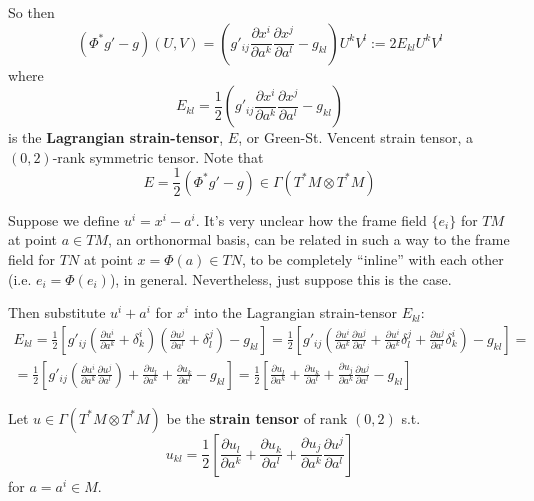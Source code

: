 \documentclass[twoside,landscape,10pt]{amsart}
\theoremstyle{plain}
\theoremstyle{definition}
\theoremstyle{remark}
\begin{document}
\begin{multicols*}{2}
So then 
\[
(\Phi^* g' - g)(U,V) = \left( g'_{ij} \frac{ \partial x^i}{ \partial a^k} \frac{ \partial x^j}{ \partial a^l} - g_{kl}  \right) U^k V^l := 2 E_{kl} U^k V^l
\]
where
\begin{equation}
  E_{kl} = \frac{1}{2} (g'_{ij} \frac{ \partial x^i}{ \partial a^k} \frac{ \partial x^j}{ \partial a^l } - g_{kl } )
\end{equation}
is the \textbf{Lagrangian strain-tensor}, $E$, or Green-St. Vencent strain tensor, a $(0,2)$-rank symmetric tensor.  Note that 
\begin{equation}
  E = \frac{1}{2} ( \Phi^*g' - g ) \in \Gamma(T^*M\otimes T^*M)
\end{equation}

Suppose we define $u^i = x^i-a^i$.  It's very unclear how the frame field $\lbrace e_i \rbrace$ for $TM$ at point $a\in TM$, an orthonormal basis, can be related in such a way to the frame field for $TN$ at point $x = \Phi(a) \in TN$, to be completely ``inline'' with each other (i.e. $e_i = \Phi(e_i)$), in general.  Nevertheless, just suppose this is the case.  

Then substitute $u^i +a^i$ for $x^i$ into the Lagrangian strain-tensor $E_{kl}$:
\[
\begin{gathered}
  E_{kl} = \frac{1}{2} \left[ g'_{ij} \left( \frac{ \partial u^i}{ \partial a^k} + \delta^i_k  \right) \left( \frac{ \partial u^j}{ \partial a^l } + \delta^j_l \right) - g_{kl } \right] = \frac{1}{2} \left[ g'_{ij} \left( \frac{ \partial u^i }{ \partial a^k } \frac{ \partial u^j}{ \partial a^l} + \frac{ \partial u^i }{ \partial a^k} \delta^j_l + \frac{ \partial u^j}{ \partial a^l} \delta^i_k \right) - g_{kl} \right] = \\ 
  = \frac{1}{2} \left[ g'_{ij} \left(\frac{ \partial u^i }{ \partial a^k} \frac{ \partial u^j }{ \partial a^l } \right) + \frac{ \partial u_l }{ \partial a^k} + \frac{ \partial u_k}{ \partial a^l} - g_{kl} \right] = \frac{1}{2} \left[ \frac{ \partial u_l }{ \partial a^k} + \frac{ \partial u_k }{ \partial a^l} + \frac{ \partial u_j}{ \partial a^k} \frac{ \partial u^j}{ \partial a^l} - g_{kl} \right]
\end{gathered}
\]

Let $u \in \Gamma(T^*M \otimes T^*M)$ be the \textbf{strain tensor} of rank $(0,2)$ s.t.
\begin{equation}
  u_{kl} = \frac{1}{2} \left[ \frac{ \partial u_l}{ \partial a^k} + \frac{ \partial u_k}{ \partial a^l} + \frac{ \partial u_j}{ \partial a^k} \frac{ \partial u^j}{ \partial a^l } \right]
\end{equation}
for $a= a^i \in M$.  


\end{multicols*}
\end{document}
